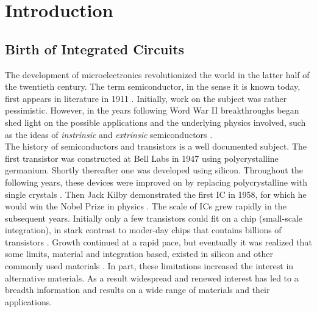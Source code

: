 \chapter{Introduction}\label{sec:intro}
\section{Birth of Integrated Circuits}
The development of microelectronics revolutionized the world in the latter half of the twentieth century. The term semiconductor, in the sense it is known today, first appears in literature in 1911 \cite{Koenigsberger_AnnalenDerPhysik1911}. Initially, work on the subject was rather pessimistic. However, in the years following Word War II breakthroughs began shed light on the possible applications and the underlying physics involved, such as the ideas of \emph{instrinsic} and \emph{extrinsic} semiconductors \cite{Busch_EuroJournPhys1989,Lark_AAAS1954,Wilson_Royal1931a,Wilson_Royal1931b}. \\

\noindent The history of semiconductors and transistors is a well documented subject. The first transistor was constructed at Bell Labs in 1947 using polycrystalline germanium. Shortly thereafter one was developed using silicon. Throughout the following years, these devices were improved on by replacing polycrystalline with single crystals \cite{Neamen_Semiconductor_Physics2003}. Then Jack Kilby demonstrated the first  \ac{IC} in 1958, for which he would win the Nobel Prize in physics \cite{Lukasiak_JorunTelcomm2010, Kilby_Patent1959}. The scale of \acp{IC} grew rapidly in the subsequent years. Initially only a few transistors could fit on a chip (small-scale integration), in stark contrast to moder-day chips that contains billions of transistors \cite{Moore_Electronics1965, Clarke_EEtimes2005}. Growth continued at a rapid pace, but eventually it was realized that some limits, material and integration based, existed in silicon and other commonly used materials \cite{Meindl_Science2001, Schulz_Nature1999}. In part, these limitations increased the interest in alternative materials. As a result widespread and renewed interest has led to a breadth information and results on a wide range of materials and their applications.

